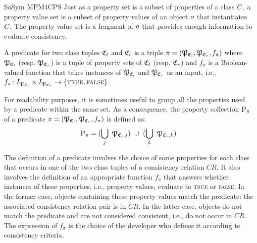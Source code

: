 \begin{copiedFrom}{SoSym MPM4CPS}
Just as a property set is a subset of properties of a class $C_{}$, a property value set is a subset of property values of an object $o_{}$ that instantiates $C_{}$. The property value set is a fragment of $o_{}$ that provides enough information to evaluate consistency.

\begin{definition}[Predicate]
A predicate for two class tuples $\mathfrak{C}_{l}$ and $\mathfrak{C}_{l}$ is a triple $\pi = (\mathfrak{P}_{\mathfrak{C}_{l}}, \mathfrak{P}_{\mathfrak{C}_{r}}, f_\pi)$ where $\mathfrak{P}_{\mathfrak{C}_{l}}$ (resp. $\mathfrak{P}_{\mathfrak{C}_{r}}$) is a tuple of property sets of $\mathfrak{C}_{l}$ (resp. $\mathfrak{C}_{r}$) and $f_\pi$ is a Boolean-valued function that takes instances of $\mathfrak{P}_{\mathfrak{C}_{l}}$ and $\mathfrak{P}_{\mathfrak{C}_{r}}$ as an input, i.e., $f_\pi \colon I_{\mathfrak{P}_{\mathfrak{C}_{l}}} \times I_{\mathfrak{P}_{\mathfrak{C}_{r}}} \to \{\textsc{true}, \textsc{false}\}$.
\end{definition}

For readability purposes, it is sometimes useful to group all the properties used by a predicate within the same set. As a consequence, the property collection $\mathrm{P}_{\pi}$ of a predicate $\pi = (\mathfrak{P}_{\mathfrak{C}_{l}}, \mathfrak{P}_{\mathfrak{C}_{r}}, f_\pi)$ is defined as:
\begin{align*}
    \formulaskip &
    \propertycollection{\pi} = (\bigcup_{j}\ \tuple{P}_{\classtuple{C}{l}, j})\ \cup\ (\bigcup_{k}\ \tuple{P}_{\classtuple{C}{r}, k})  
\end{align*}

The definition of a predicate involves the choice of some properties for each class that occurs in one of the two class tuples of a consistency relation $CR$. It also involves the definition of an appropriate function $f_\pi$ that answers whether instances of these properties, i.e., property values, evaluate to \textsc{true} or \textsc{false}. In the former case, objects containing these property values match the predicate: the associated consistency relation pair is in $CR$. In the latter case, objects do not match the predicate and are not considered consistent, i.e., do not occur in $CR$. The expression of $f_\pi$ is the choice of the developer who defines it according to consistency criteria.


\end{copiedFrom}
